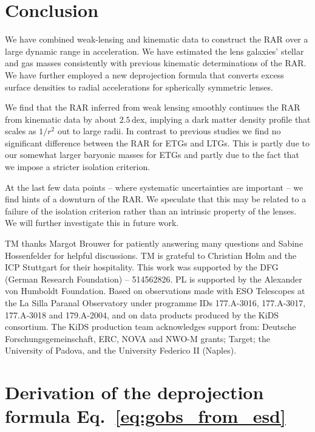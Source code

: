 \documentclass[a4paper,11pt]{article}
\begin{document}
\section{Conclusion}
\label{sec:conclusion}

We have combined weak-lensing and kinematic data to construct the RAR over a large dynamic range in acceleration.
We have estimated the lens galaxies' stellar and gas masses consistently with previous kinematic determinations of the RAR.
We have further employed a new deprojection formula that converts excess surface densities to radial accelerations for spherically symmetric lenses.

We find that the RAR inferred from weak lensing smoothly continues the RAR from kinematic data by about $2.5\,\mathrm{dex}$, implying a dark matter density profile that scales as $1/r^2$ out to large radii.
In contrast to previous studies we find no significant difference between the RAR for ETGs and LTGs.
This is partly due to our somewhat larger baryonic masses for ETGs and partly due to the fact that we impose a stricter isolation criterion.

At the last few data points -- where systematic uncertainties are important -- we find hints of a downturn of the RAR.
We speculate that this may be related to a failure of the isolation criterion rather than an intrinsic property of the lenses.
We will further investigate this in future work.

\acknowledgments

TM thanks Margot Brouwer for patiently answering many questions and Sabine Hossenfelder for helpful discussions.
TM is grateful to Christian Holm and the ICP Stuttgart for their hospitality.
This work was supported by the DFG (German Research Foundation) – 514562826.
PL is supported by the Alexander von Humboldt Foundation.
Based on observations made with ESO Telescopes at the La Silla Paranal Observatory under programme IDs 177.A-3016, 177.A-3017, 177.A-3018 and 179.A-2004, and on data products produced by the KiDS consortium. The KiDS production team acknowledges support from: Deutsche Forschungsgemeinschaft, ERC, NOVA and NWO-M grants; Target; the University of Padova, and the University Federico II (Naples).

\appendix

\section{Derivation of the deprojection formula Eq.~\eqref{eq:gobs_from_esd}}
\label{sec:appendix:derivation}
\end{document}
